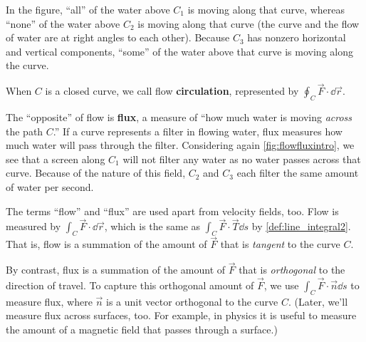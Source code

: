 In the figure, ``all'' of the water above $C_1$ is moving along that curve, whereas ``none'' of the water above $C_2$ is moving along that curve (the curve and the flow of water are at right angles to each other). Because $C_3$ has nonzero horizontal and vertical components, ``some'' of the water above that curve is moving along the curve.

When $C$ is a closed curve, we call flow \textbf{circulation}, represented by $\oint_C \vec F\cdot\dd\vec r$.


The ``opposite'' of flow is \textbf{flux}, a measure of ``how much water is moving \emph{across} the path $C$.'' If a curve represents a filter in flowing water, flux measures how much water will pass through the filter. Considering again \autoref{fig:flowfluxintro}, we see that a screen along $C_1$ will not filter any water as no water passes across that curve. Because of the nature of this field,  $C_2$ and $C_3$ each filter the same amount of water per second. 

The terms ``flow'' and ``flux'' are used apart from velocity fields, too. Flow is measured by $\int_C \vec F\cdot\dd\vec r$, which is the same as $\int_C \vec F\cdot\vec T\dd s$ by \autoref{def:line_integral2}. That is, flow is a summation of the amount of $\vec F$ that is \emph{tangent} to the curve $C$. %

By contrast, flux is a summation of the amount of $\vec F$ that is \emph{orthogonal} to the direction of travel. To capture this orthogonal amount of $\vec F$, we use $\int_C \vec F \cdot \vec n\dd s$ to measure flux, where $\vec n$ is a unit vector orthogonal to the curve $C$. %
(Later, we'll measure flux across surfaces, too. %
For example, in physics it is useful to measure the amount of a magnetic field that passes through a surface.)

